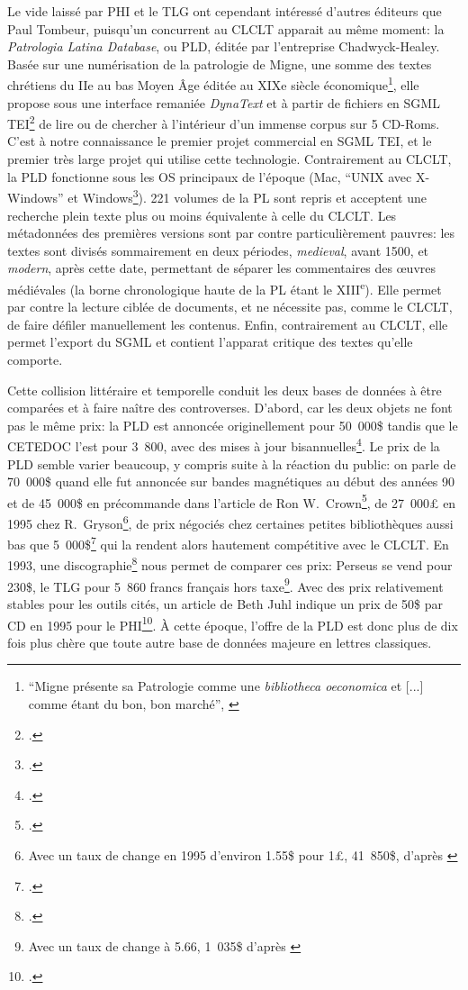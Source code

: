 Le vide laissé par PHI et le TLG ont cependant intéressé d'autres éditeurs que Paul Tombeur, puisqu'un concurrent au CLCLT apparait au même moment: la \textit{Patrologia Latina Database}, ou PLD, éditée par l'entreprise Chadwyck-Healey. Basée sur une numérisation de la patrologie de Migne, une somme des textes chrétiens du IIe au bas Moyen Âge éditée au XIXe siècle économique\footnote{\enquote{Migne présente sa Patrologie comme une \textit{bibliotheca oeconomica} et {[...]} comme étant du bon, bon marché}, \cite[p. 228]{tombeur_pld_1993}}, elle propose sous une interface remaniée \textit{DynaText} et à partir de fichiers en SGML TEI\footcite{smith_dynatext_1993} de lire ou de chercher à l'intérieur d'un immense corpus sur 5 CD-Roms. C'est à notre connaissance le premier projet commercial en SGML TEI, et le premier très large projet qui utilise cette technologie. Contrairement au CLCLT, la PLD fonctionne sous les OS principaux de l'époque (Mac, \enquote{UNIX avec X-Windows} et Windows\footcite{smith_dynatext_1993}). 221 volumes de la PL sont repris et acceptent une recherche plein texte plus ou moins équivalente à celle du CLCLT. Les métadonnées des premières versions sont par contre particulièrement pauvres: les textes sont divisés sommairement en deux périodes, \textit{medieval}, avant 1500, et \textit{modern}, après cette date, permettant de séparer les commentaires des œuvres médiévales (la borne chronologique haute de la PL étant le XIII\textsuperscript{e}). Elle permet par contre la lecture ciblée de documents, et ne nécessite pas, comme le CLCLT, de faire défiler manuellement les contenus. Enfin, contrairement au CLCLT, elle permet l'export du SGML et contient l'apparat critique des textes qu'elle comporte.

Cette collision littéraire et temporelle conduit les deux bases de données à être comparées et à faire naître des controverses. D'abord, car les deux objets ne font pas le même prix: la PLD est annoncée originellement pour 50~000\$ tandis que le CETEDOC l'est pour 3~800, avec des mises à jour bisannuelles\footcite{bucknall_review_1994}. Le prix de la PLD semble varier beaucoup, y compris suite à la réaction du public: on parle de 70~000\$ quand elle fut annoncée sur bandes magnétiques au début des années 90 et de 45~000\$ en précommande dans l'article de Ron W.~Crown\footcite{crown_comparing_2000}, de 27~000£ en 1995 chez R.~Gryson\footnote{Avec un taux de change en 1995 d'environ 1.55\$ pour 1£, 41~850\$, d'après \cite{noauthor_british_2021}}, de prix négociés chez certaines petites bibliothèques aussi bas que 5~000\$\footcite[Note 10, p.~108]{crown_comparing_2000} qui la rendent alors hautement compétitive avec le CLCLT. En 1993, une discographie\footcite{pellen_les_1993} nous permet de comparer ces prix: Perseus se vend pour 230\$, le TLG pour 5~860 francs français hors taxe\footnote{Avec un taux de change à 5.66, 1~035\$ d'après \cite{noauthor_france_nodate}}. Avec des prix relativement stables pour les outils cités, un article de Beth Juhl indique un prix de 50\$ par CD en 1995 pour le PHI\footcite{juhl_ex_1995}. À cette époque, l'offre de la PLD est donc plus de dix fois plus chère que toute autre base de données majeure en lettres classiques.


